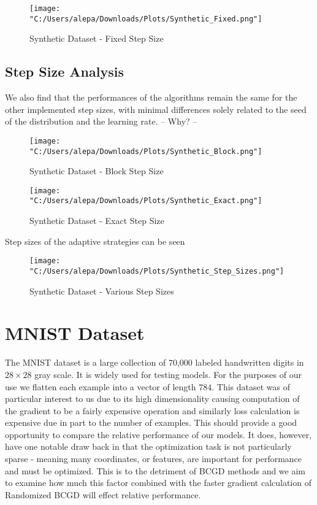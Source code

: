 \documentclass{article}
\begin{document}
\begin{figure}[H]
    \centering
    \texttt{[image: "C:/Users/alepa/Downloads/Plots/Synthetic\_Fixed.png"]}
    \caption{Synthetic Dataset - Fixed Step Size}
    \label{fig:synthetic_fixed}
\end{figure}

\subsection{Step Size Analysis}
We also find that the performances of the algorithms remain the same for the other implemented step sizes, with minimal differences solely related to the seed of the distribution and the learning rate. -- Why? --

\begin{figure}[H]
    \centering
    \texttt{[image: "C:/Users/alepa/Downloads/Plots/Synthetic\_Block.png"]}
    \caption{Synthetic Dataset - Block Step Size}
    \label{fig:synthetic_block}
\end{figure}

\begin{figure}[H]
    \centering
    \texttt{[image: "C:/Users/alepa/Downloads/Plots/Synthetic\_Exact.png"]}
    \caption{Synthetic Dataset - Exact Step Size}
    \label{fig:synthetic_exact}
\end{figure}

Step sizes of the adaptive strategies can be seen
\begin{figure}[H]
    \centering
    \texttt{[image: "C:/Users/alepa/Downloads/Plots/Synthetic\_Step\_Sizes.png"]}
    \caption{Synthetic Dataset - Various Step Sizes}
    \label{fig:synthetic_step_sizes}
\end{figure}


\section{MNIST Dataset}
The MNIST dataset is a large collection of 70,000 labeled handwritten digits in $28\times28$ gray scale. It is widely used for testing models. For the purposes of our use we flatten each example into a vector of length $784$. This dataset was of particular interest to us due to its high dimensionality causing computation of the gradient to be a fairly expensive operation and similarly loss calculation is expensive due in part to the number of examples. This should provide a good opportunity to compare the relative performance of our models. It does, however, have one notable draw back in that the optimization task is not particularly sparse - meaning many coordinates, or features, are important for performance and must be optimized. This is to the detriment of BCGD methods and we aim to examine how much this factor combined with the faster gradient calculation of Randomized BCGD will effect relative performance.
\end{document}

